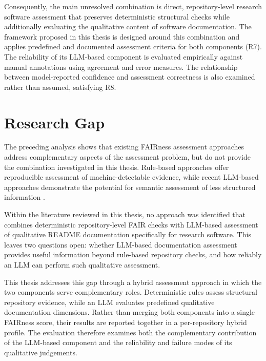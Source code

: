 Consequently, the main unresolved combination is direct,
repository-level research software assessment that preserves
deterministic structural checks while additionally evaluating the
qualitative content of software documentation. The framework proposed in this thesis is designed around this
combination and applies predefined and documented assessment criteria
for both components (R7). The reliability of its LLM-based component
is evaluated empirically against manual annotations using agreement
and error measures. The relationship between model-reported
confidence and assessment correctness is also examined rather than
assumed, satisfying R8.

\section{Research Gap}

The preceding analysis shows that existing FAIRness assessment
approaches address complementary aspects of the assessment problem,
but do not provide the combination investigated in this thesis.
Rule-based approaches offer reproducible assessment of
machine-detectable evidence, while recent LLM-based approaches
demonstrate the potential for semantic assessment of less structured
information \cite{hou2024llmse,sharma2025fairway}.

Within the literature reviewed in this thesis, no approach was
identified that combines deterministic repository-level FAIR checks
with LLM-based assessment of qualitative README documentation
specifically for research software. This leaves two questions open:
whether LLM-based documentation assessment provides useful
information beyond rule-based repository checks, and how reliably an
LLM can perform such qualitative assessment.

This thesis addresses this gap through a hybrid assessment approach
in which the two components serve complementary roles. Deterministic
rules assess structural repository evidence, while an LLM evaluates
predefined qualitative documentation dimensions. Rather than merging
both components into a single FAIRness score, their results are
reported together in a per-repository hybrid profile. The evaluation
therefore examines both the complementary contribution of the
LLM-based component and the reliability and failure modes of its
qualitative judgements.